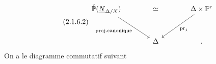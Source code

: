 \begin{equation}\tag{2.1.6.2}
\begin{tikzcd}[column sep=large, row sep=large]
\check{\mathbb{P}}(\underline{N}_{\Delta/X}) \arrow[rr, phantom, "\simeq"] \arrow[dr, "\text{proj.canonique}"'] & {} & \Delta \times \mathbb{P}^r \arrow[dl, "\mathrm{pr}_1"] \\
{} & \Delta & .
\end{tikzcd}
\end{equation}
On a le diagramme commutatif suivant

